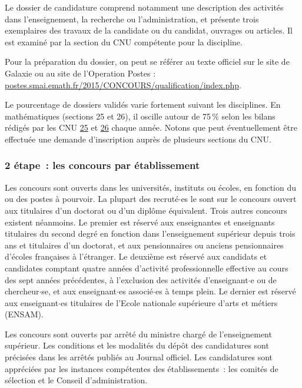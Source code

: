 Le dossier de candidature comprend notamment une
description des activit\'es dans l'enseignement, la recherche ou
l'administration, et pr\'esente trois exemplaires des travaux de la candidate ou du candidat,
ouvrages ou articles. Il est examin\'e par la section du CNU
comp\'etente pour la discipline.

Pour la pr\'eparation du dossier, on peut se r\'ef\'erer au texte officiel sur le site de Galaxie
ou au site de l'Operation Postes : \url{postes.smai.emath.fr/2015/CONCOURS/qualification/index.php}.

Le pourcentage de dossiers valid\'es
varie fortement suivant les disciplines. En math\'ematiques
(sections 25 et 26), il oscille autour de 75\,\% selon les bilans r\'edig\'es par les CNU 
\href{http://cnu25.emath.fr/}{25} et \href{http://cnu26.emath.fr/}{26} chaque ann\'ee. Notons que peut
\'eventuellement \^etre effectu\'ee
une demande d'inscription aupr\`es de plusieurs sections du CNU.

\subsubsection*{2\ieme{} \'etape~: les concours par \'etablissement}

Les concours sont ouverts dans les universit\'es, instituts ou
\'ecoles, en fonction du ou des postes \`a pourvoir. La plupart des
recrut\'e$\cdot$es le sont sur le concours ouvert aux titulaires d'un
doctorat ou d'un dipl\^ome \'equivalent. Trois autres concours
existent n\'eanmoins. Le premier est r\'eserv\'e aux enseignantes et enseignants
titulaires du second degr\'e en fonction dans l'enseignement
sup\'erieur depuis trois ans et titulaires d'un doctorat, et aux
pensionnaires ou anciens pensionnaires d'\'ecoles fran\c{c}aises \`a
l'\'etranger. Le deuxi\`eme est r\'eserv\'e aux candidats et candidates comptant
quatre ann\'ees d'activit\'e professionnelle effective au cours des
sept ann\'ees pr\'ec\'edentes, \`a l'exclusion des activit\'es
d'enseignant$\cdot$e ou de chercheur$\cdot$se, et aux enseignant$\cdot$es associ\'e$\cdot$es \`a
temps plein.
Le dernier est r\'eserv\'e aux enseignant$\cdot$es titulaires de l'Ecole nationale sup\'erieure d'arts et m\'etiers (ENSAM).

Les concours sont ouverts par arr\^et\'e du ministre charg\'e de
l'enseignement sup\'erieur. Les conditions et les modalit\'es du
d\'ep\^ot des candidatures sont pr\'ecis\'ees dans les arr\^et\'es
publi\'es au Journal officiel. Les candidatures sont
appr\'eci\'ees par les instances comp\'etentes des
\'etablissements~:
les comit\'es de s\'election et le Conseil d'administration.

